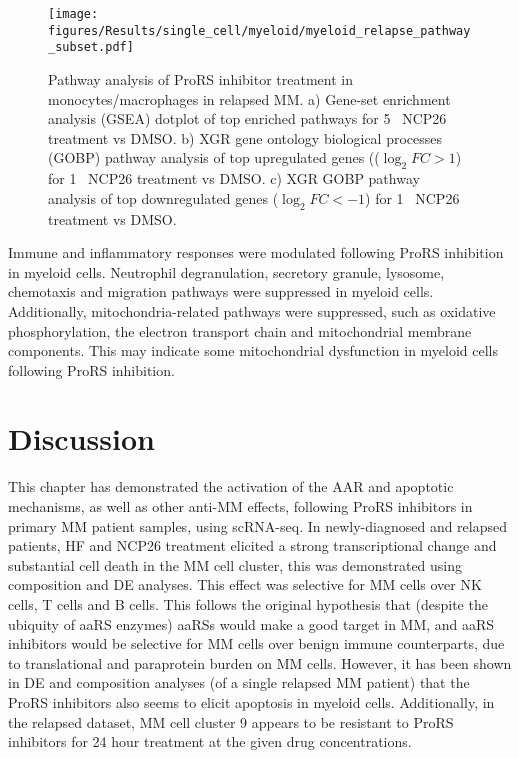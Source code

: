 \begin{figure}[htb]
\centering
\texttt{[image: figures/Results/single\_cell/myeloid/myeloid\_relapse\_pathway\_subset.pdf]}
\caption[Myeloid cell pathway analysis- relapsed MM]{Pathway analysis of ProRS inhibitor treatment in monocytes/macrophages in relapsed MM.
a) Gene-set enrichment analysis (GSEA) dotplot of top enriched pathways for 5\si{\micro\Molar} NCP26 treatment vs DMSO.
b) XGR gene ontology biological processes (GOBP) pathway analysis of top upregulated genes (($\log_{2}FC >1$) for 1\si{\micro\Molar} NCP26 treatment vs DMSO.
c) XGR GOBP pathway analysis of top downregulated genes ($\log_{2}FC < -1$) for 1\si{\micro\Molar} NCP26 treatment vs DMSO.
}
\label{fig:myeloid_pathway_relapsed}
\end{figure}
Immune and inflammatory responses were modulated following ProRS inhibition in myeloid cells.
Neutrophil degranulation, secretory granule, lysosome, chemotaxis and migration pathways were suppressed in myeloid cells.
Additionally, mitochondria-related pathways were suppressed, such as oxidative phosphorylation, the electron transport chain and mitochondrial membrane components.
This may indicate some mitochondrial dysfunction in myeloid cells following ProRS inhibition.

\clearpage
\section{Discussion}
This chapter has demonstrated the activation of the AAR and apoptotic mechanisms, as well as other anti-MM effects, following ProRS inhibitors in primary MM patient samples, using scRNA-seq.
In newly-diagnosed and relapsed patients, HF and NCP26 treatment elicited a strong transcriptional change and substantial cell death in the MM cell cluster, this was demonstrated using composition and DE analyses.
This effect was selective for MM cells over NK cells, T cells and B cells.
This follows the original hypothesis that (despite the ubiquity of aaRS enzymes) aaRSs would make a good target in MM, and aaRS inhibitors would be selective for MM cells over benign immune counterparts, due to translational and paraprotein burden on MM cells.
However, it has been shown in DE and composition analyses (of a single relapsed MM patient) that the ProRS inhibitors also seems to elicit apoptosis in myeloid cells.
Additionally, in the relapsed dataset, MM cell cluster 9 appears to be resistant to ProRS inhibitors for 24 hour treatment at the given drug concentrations.

